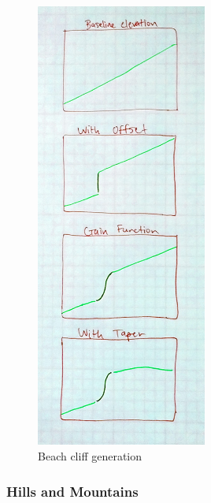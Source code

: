 \begin{figure}
  \centering
    \includegraphics[width=0.5\textwidth]{figures/beach_cliffs}
  \caption{Beach cliff generation }
  \label{fig:beach_cliffs}
\end{figure}

\subsubsection{Hills and Mountains}
